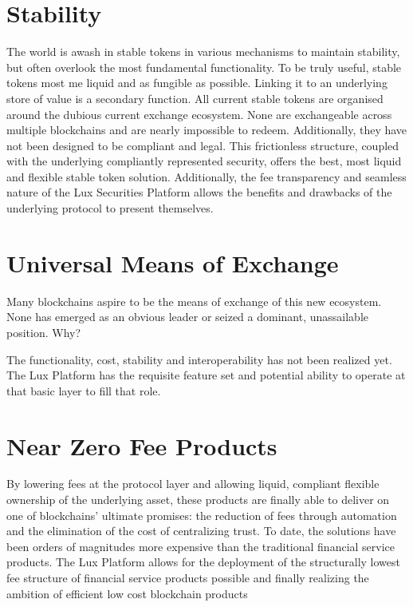 \documentclass[11pt]{article}
\begin{document}
\section{Stability}

The world is awash in stable tokens in various mechanisms to maintain stability, but often overlook the most fundamental functionality. To be truly useful, stable tokens most me liquid and as fungible as possible. Linking it to an underlying store of value is a secondary function. All current stable tokens are organised around the dubious current exchange ecosystem. None are exchangeable across multiple blockchains and are nearly impossible to redeem. Additionally, they have not been designed to be compliant and legal. This frictionless structure, coupled with the underlying compliantly represented security, offers the best, most liquid and flexible stable token solution. Additionally, the fee transparency and seamless nature of the Lux Securities Platform allows the benefits and drawbacks of the underlying protocol to present themselves.


\section{Universal Means of Exchange}

Many blockchains aspire to be the means of exchange of this new ecosystem. None has emerged as an obvious leader or seized a dominant, unassailable position. Why?


The functionality, cost, stability and interoperability has not been realized yet. The Lux Platform has the requisite feature set and potential ability to operate at that basic layer to fill that role.


\section{Near Zero Fee Products}

By lowering fees at the protocol layer and allowing liquid, compliant flexible ownership of the underlying asset, these products are finally able to deliver on one of blockchains' ultimate promises: the reduction of fees through automation and the elimination of the cost of centralizing trust. To date, the solutions have been orders of magnitudes more expensive than the traditional financial service products. The Lux Platform allows for the deployment of the structurally lowest fee structure of financial service products possible and finally realizing the ambition of efficient low cost blockchain products
\end{document}
